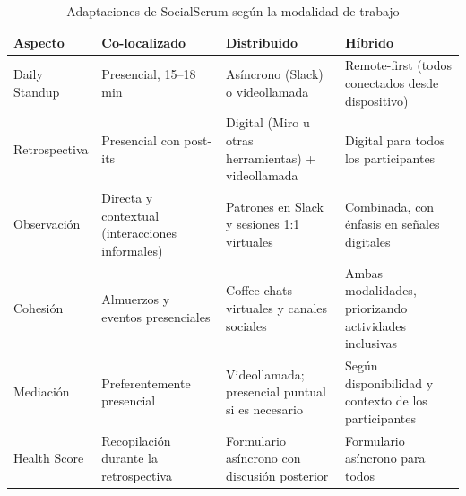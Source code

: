 \begin{table}[h]
    \centering
    \footnotesize
    \begin{tabularx}{\textwidth}{|l|X|X|X|}
        \hline
        \textbf{Aspecto} & \textbf{Co-localizado}                                & \textbf{Distribuido} & \textbf{Híbrido} \\
        \hline
        Daily Standup
                         & Presencial, 15--18 min
                         & Asíncrono (Slack) o videollamada
                         & Remote-first (todos conectados desde dispositivo)                                               \\
        \hline
        Retrospectiva
                         & Presencial con post-its
                         & Digital (Miro u otras herramientas) + videollamada
                         & Digital para todos los participantes                                                            \\
        \hline
        Observación
                         & Directa y contextual (interacciones informales)
                         & Patrones en Slack y sesiones 1:1 virtuales
                         & Combinada, con énfasis en señales digitales                                                     \\
        \hline
        Cohesión
                         & Almuerzos y eventos presenciales
                         & Coffee chats virtuales y canales sociales
                         & Ambas modalidades, priorizando actividades inclusivas                                           \\
        \hline
        Mediación
                         & Preferentemente presencial
                         & Videollamada; presencial puntual si es necesario
                         & Según disponibilidad y contexto de los participantes                                            \\
        \hline
        Health Score
                         & Recopilación durante la retrospectiva
                         & Formulario asíncrono con discusión posterior
                         & Formulario asíncrono para todos                                                                 \\
        \hline
    \end{tabularx}
    \caption{Adaptaciones de SocialScrum según la modalidad de trabajo}
    \label{tab:adaptaciones-modalidad}
\end{table}
\FloatBarrier

